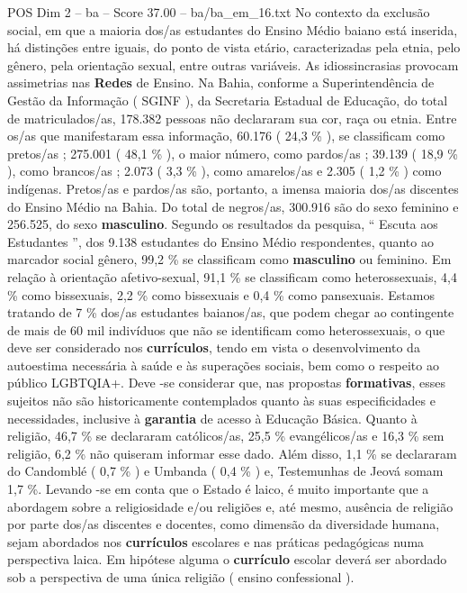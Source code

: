 \begin{textsample}{POS Dim 2 – ba – Score 37.00 – ba/ba\_em\_16.txt}
No contexto da exclusão social, em que a maioria dos/as estudantes do Ensino Médio baiano está inserida, há distinções entre iguais, do ponto de vista etário, caracterizadas pela etnia, pelo gênero, pela orientação sexual, entre outras variáveis.
As idiossincrasias provocam assimetrias nas \textbf{Redes} de Ensino.
Na Bahia, conforme a Superintendência de Gestão da Informação ( SGINF ), da Secretaria Estadual de Educação, do total de matriculados/as, 178.382 pessoas não declararam sua cor, raça ou etnia.
Entre os/as que manifestaram essa informação, 60.176 ( 24,3 \% ), se classificam como pretos/as ; 275.001 ( 48,1 \% ), o maior número, como pardos/as ; 39.139 ( 18,9 \% ), como brancos/as ; 2.073 ( 3,3 \% ), como amarelos/as e 2.305 ( 1,2 \% ) como indígenas.
Pretos/as e pardos/as são, portanto, a imensa maioria dos/as discentes do Ensino Médio na Bahia.
Do total de negros/as, 300.916 são do sexo feminino e 256.525, do sexo \textbf{masculino}.
Segundo os resultados da pesquisa, “ Escuta aos Estudantes ”, dos 9.138 estudantes do Ensino Médio respondentes, quanto ao marcador social gênero, 99,2 \% se classificam como \textbf{masculino} ou feminino.
Em relação à orientação afetivo-sexual, 91,1 \% se classificam como heterossexuais, 4,4 \% como bissexuais, 2,2 \% como bissexuais e 0,4 \% como pansexuais.
Estamos tratando de 7 \% dos/as estudantes baianos/as, que podem chegar ao contingente de mais de 60 mil indivíduos que não se identificam como heterossexuais, o que deve ser considerado nos \textbf{currículos}, tendo em vista o desenvolvimento da autoestima necessária à saúde e às superações sociais, bem como o respeito ao público LGBTQIA+.
Deve -se considerar que, nas propostas \textbf{formativas}, esses sujeitos não são historicamente contemplados quanto às suas especificidades e necessidades, inclusive à \textbf{garantia} de acesso à Educação Básica.
Quanto à religião, 46,7 \% se declararam católicos/as, 25,5 \% evangélicos/as e 16,3 \% sem religião, 6,2 \% não quiseram informar esse dado.
Além disso, 1,1 \% se declararam do Candomblé ( 0,7 \% ) e Umbanda ( 0,4 \% ) e, Testemunhas de Jeová somam 1,7 \%.
Levando -se em conta que o Estado é laico, é muito importante que a abordagem sobre a religiosidade e/ou religiões e, até mesmo, ausência de religião por parte dos/as discentes e docentes, como dimensão da diversidade humana, sejam abordados nos \textbf{currículos} escolares e nas práticas pedagógicas numa perspectiva laica.
Em hipótese alguma o \textbf{currículo} escolar deverá ser abordado sob a perspectiva de uma única religião ( ensino confessional ).

\end{textsample}
